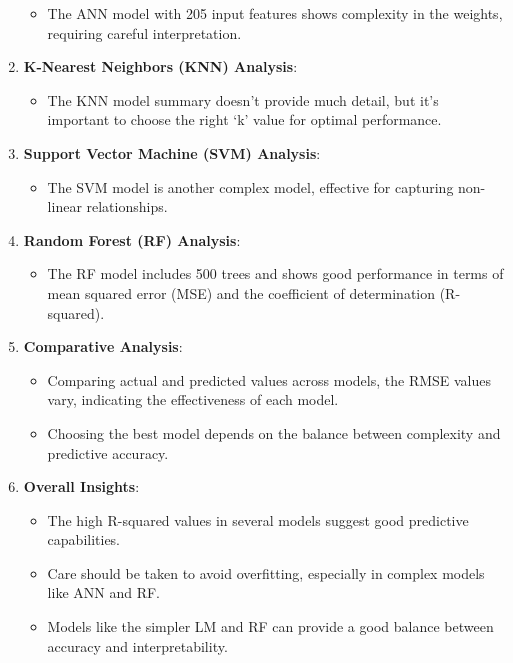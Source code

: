 \documentclass[
]{article}
\providecommand{\tightlist}{%
  \setlength{\itemsep}{0pt}\setlength{\parskip}{0pt}}
\begin{document}
\begin{enumerate}
  \begin{itemize}
  \tightlist
  \item
    The ANN model with 205 input features shows complexity in the
    weights, requiring careful interpretation.
  \end{itemize}
\item
  \textbf{K-Nearest Neighbors (KNN) Analysis}:

  \begin{itemize}
  \tightlist
  \item
    The KNN model summary doesn't provide much detail, but it's
    important to choose the right `k' value for optimal performance.
  \end{itemize}
\item
  \textbf{Support Vector Machine (SVM) Analysis}:

  \begin{itemize}
  \tightlist
  \item
    The SVM model is another complex model, effective for capturing
    non-linear relationships.
  \end{itemize}
\item
  \textbf{Random Forest (RF) Analysis}:

  \begin{itemize}
  \tightlist
  \item
    The RF model includes 500 trees and shows good performance in terms
    of mean squared error (MSE) and the coefficient of determination
    (R-squared).
  \end{itemize}
\item
  \textbf{Comparative Analysis}:

  \begin{itemize}
  \tightlist
  \item
    Comparing actual and predicted values across models, the RMSE values
    vary, indicating the effectiveness of each model.
  \item
    Choosing the best model depends on the balance between complexity
    and predictive accuracy.
  \end{itemize}
\item
  \textbf{Overall Insights}:

  \begin{itemize}
  \tightlist
  \item
    The high R-squared values in several models suggest good predictive
    capabilities.
  \item
    Care should be taken to avoid overfitting, especially in complex
    models like ANN and RF.
  \item
    Models like the simpler LM and RF can provide a good balance between
    accuracy and interpretability.
  \end{itemize}
\end{enumerate}
\end{document}
